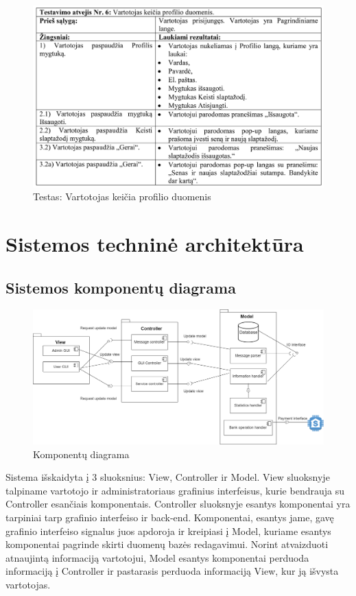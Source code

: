 \documentclass[oneside]{VUMIFPSkursinis}
\begin{document}
			\begin{figure}[h]
    				\centering
    				\includegraphics[width=1\textwidth]{test6.png}
    				\caption{Testas: Vartotojas keičia profilio duomenis}
    				\label{fig:Testas: Vartotojas keičia profilio duomenis}
			\end{figure}

\section{Sistemos techninė architektūra}
	\subsection{Sistemos komponentų diagrama}
			\begin{figure}[h]
    				\centering
    				\includegraphics[width=1\textwidth]{KomponentuDiagrama.png}
    				\caption{Komponentų diagrama}
    				\label{fig:Komponentų diagrama}
			\end{figure}

	Sistema išskaidyta į 3 sluoksnius: View, Controller ir Model. View sluoksnyje talpiname vartotojo ir administratoriaus grafinius interfeisus, kurie bendrauja su Controller esančiais komponentais. Controller sluoksnyje esantys komponentai yra tarpiniai tarp grafinio interfeiso ir back-end. Komponentai, esantys jame, gavę grafinio interfeiso signalus juos apdoroja ir kreipiasi į Model, kuriame esantys komponentai pagrinde skirti duomenų bazės redagavimui. Norint atvaizduoti atnaujintą informaciją vartotojui, Model esantys komponentai perduoda informaciją į Controller ir pastarasis perduoda informaciją View, kur ją išvysta vartotojas.
\end{document}

